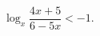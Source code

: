 \begin{ex}[type=inequality]
	\begin{condition}
		$ \log_x\dfrac{4x + 5}{6 - 5x}<-1 .$
	\end{condition}
\end{ex}